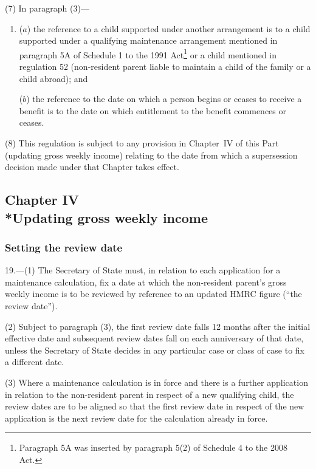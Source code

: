 \documentclass[12pt,a4paper]{article}
\begin{document}
(7) In paragraph (3)—
\begin{enumerate}\item[]
($a$) the reference to a child supported under another arrangement is to a child supported under a qualifying maintenance arrangement mentioned in paragraph 5A of Schedule 1 to the 1991 Act\footnote{Paragraph 5A was inserted by paragraph 5(2) of Schedule 4 to the 2008 Act.} or a child mentioned in regulation 52 (non-resident parent liable to maintain a child of the family or a child abroad); and

($b$) the reference to the date on which a person begins or ceases to receive a benefit is to the date on which entitlement to the benefit commences or ceases.
\end{enumerate}

(8) This regulation is subject to any provision in Chapter~IV of this Part (updating gross weekly income) relating to the date from which a supersession decision made under that Chapter takes effect.

\subsection[Chapter IV --- Updating gross weekly income]{Chapter IV\\*Updating gross weekly income}

\renewcommand\parthead{--- Part III Chapter IV}

\subsubsection[19. Setting the review date]{Setting the review date}

19.---(1)  The Secretary of State must, in relation to each application for a maintenance calculation, fix a date at which the non-resident parent’s gross weekly income is to be reviewed by reference to an updated HMRC figure (“the review date”).

(2) Subject to paragraph (3), the first review date falls 12 months after the initial effective date and subsequent review dates fall on each anniversary of that date, unless the Secretary of State decides in any particular case or class of case to fix a different date.

(3) Where a maintenance calculation is in force and there is a further application in relation to the non-resident parent in respect of a new qualifying child, the review dates are to be aligned so that the first review date in respect of the new application is the next review date for the calculation already in force.
\end{document}
